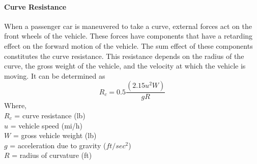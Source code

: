 \paragraph{Curve Resistance}
When a passenger car is maneuvered to take a curve, external forces act on the front wheels of the vehicle. These forces have components that have a retarding effect on the forward motion of the vehicle. The sum effect of these components constitutes the curve resistance. This resistance depends on the radius of the curve, the gross weight of the vehicle, and the velocity at which the vehicle is moving. It can be determined as
\begin{equation}
	R_c = 0.5 \frac{(2.15 u^2 W)}{gR}
\end{equation}
Where,\\
\hspace*{10mm}$R_c$ = curve resistance (lb)\\
\hspace*{10mm}$u$ = vehicle speed (mi/h)\\
\hspace*{10mm}$W$ = gross vehicle weight (lb)\\
\hspace*{10mm}$g$ = acceleration due to gravity ($ft/sec^2$)\\
\hspace*{10mm}$R$ = radius of curvature (ft)
